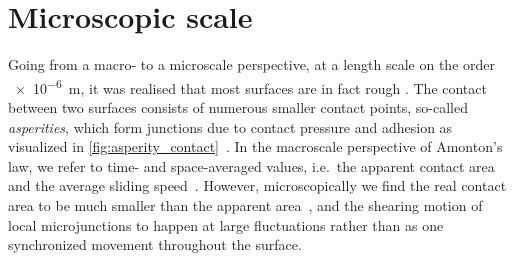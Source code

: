 






\section{Microscopic scale}\label{sec:microscale}
Going from a macro- to a microscale perspective, at a length scale on the order
\SI{e-6}{m}, it was realised that most surfaces are in fact rough
\cite{mo_friction_2009}. The contact between two surfaces consists of numerous
smaller contact points, so-called \textit{asperities}, which form junctions due to contact pressure and adhesion as visualized in \cref{fig:asperity_contact}~\cite{kim_nano-scale_2009}. In the macroscale perspective of Amonton's law, we refer to time- and space-averaged values, i.e.\ the apparent contact area and the average
sliding speed~\cite{gao_frictional_2004}. However, microscopically we find the
real contact area to be much smaller than the apparent area~\cite{kim_nano-scale_2009}, and the shearing motion of local microjunctions to happen at large fluctuations rather than as one synchronized movement throughout the surface. 

